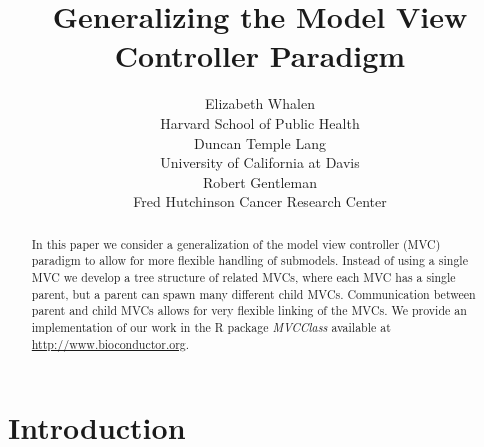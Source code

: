 \documentclass[11pt]{article}
\newcommand{\Rpackage}[1]{{\textit{#1}}}
\begin{document}


\author{Elizabeth Whalen\\Harvard School of Public Health \\ 
        Duncan Temple Lang\\University of California at Davis \\
        Robert Gentleman\\Fred Hutchinson Cancer Research Center}
\title{Generalizing the Model View Controller Paradigm}

\maketitle

\begin{abstract} 
In this paper we consider a generalization of the model
  view controller (MVC) paradigm to allow for more flexible handling
  of submodels. Instead of using a single MVC we develop a tree
  structure of related MVCs, where each MVC has a single parent, but a
  parent can spawn many different child MVCs. Communication between
  parent and child MVCs allows for very flexible linking of the
  MVCs. We provide an implementation of our work in the R package
\Rpackage{MVCClass} available at \url{http://www.bioconductor.org}. 
\end{abstract}


\setlength{\baselineskip}{20pt}


\section{Introduction}
\label{Sec:Intro}



\end{document}
